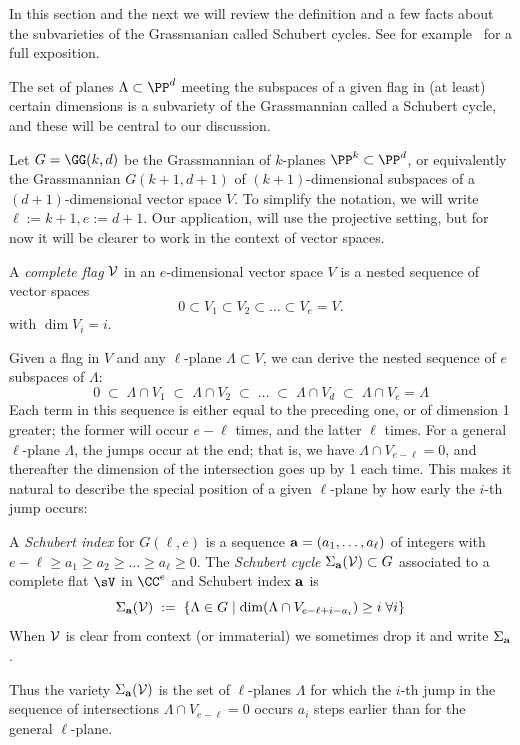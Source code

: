 In this section and the next we will review the definition and a few facts about the subvarieties of the Grassmanian called Schubert cycles.
See for example~\cite[Chapters 3 and 4]{3264} for a full exposition.

The set of planes $\Lambda \subset \PP^d$ meeting  the subspaces of a given flag in (at least) certain dimensions
is a subvariety of the Grassmannian called a Schubert cycle, and these will be central to our discussion.

Let $G = \GG(k, d)$ be the Grassmannian of $k$-planes $\PP^k \subset \PP^d$, or equivalently the Grassmannian $G(k+1,d+1)$ of $(k+1)$-dimensional subspaces of a $(d+1)$-dimensional vector space $V$.
To simplify the notation, we will write $\ell := k+1, e:= d+1$.
Our application, will use the projective setting, but for now it will be clearer to work in the context  of vector spaces.

\begin{definition}
A \emph{complete flag} $\cal V$  in an $e$-dimensional vector space $V$ is a nested sequence of vector spaces
$$
0 \subset V_1 \subset V_2 \subset \dots  \subset V_{e} = V.
$$
with $\dim V_i = i$.
\end{definition}

Given a flag in $V$ and any  $\ell$-plane $\Lambda \subset V$, we can derive the nested sequence of $e$ subspaces of $\Lambda$:
$$
0 \; \subset \; \Lambda \cap V_1 \; \subset \;  \Lambda \cap V_2 \; \subset \;  \dots \; \subset \;  \Lambda \cap V_d \; \subset \;  \Lambda \cap V_{e} = \Lambda
$$
Each term in this sequence is either equal to the preceding one, or of dimension 1 greater; the former will occur $e-\ell$ times, and the latter $\ell$ times. For a general $\ell $-plane $\Lambda$, the jumps occur at the end; that is, we have $\Lambda \cap V_{e-\ell} = 0$, and thereafter the dimension of the intersection goes up by 1 each time. This makes it natural
to describe the special position of a given $\ell $-plane by how early the $i$-th jump occurs: 

\begin{definition}
A \emph{Schubert index} for $G(\ell, e)$ is a sequence ${\bf a} = (a_1,\dots,a_{\ell})$ of integers with $e-\ell \geq a_1 \geq a_2 \geq \dots \geq a_{\ell} \geq 0$.
The \emph{Schubert cycle $\Sigma_{\bf a}({\cal V}) \subset G$} associated to a complete flat $\sV$ in $\CC^e$ and
Schubert index $\bf a$  is 
$$
\Sigma_{\bf a}({\cal V}) \; := \; \left\{ \Lambda \in G \mid \dim(\Lambda \cap V_{e-\ell+i-a_i}) \geq i \; \forall i \right\}
$$
When $\cal V$ is clear from context (or immaterial) we sometimes drop it and write $\Sigma_{\bf a}$.
\end{definition}
Thus the variety  $\Sigma_{\bf a}({\cal V})$ is the set of $\ell $-planes $\Lambda$ for which the $i$-th jump in the sequence of intersections $\Lambda \cap V_{e-\ell} = 0$ occurs
$a_i$ steps earlier than for the general $\ell $-plane. 

